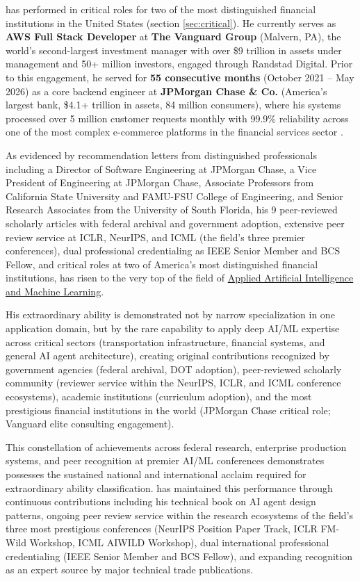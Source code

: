 \dr has performed in critical roles for two of the most distinguished financial institutions in the United States (section \ref{sec:critical}). He currently serves as \textbf{AWS Full Stack Developer} at \textbf{The Vanguard Group} (Malvern, PA), the world's second-largest investment manager with over \$9 trillion in assets under management and 50+ million investors, engaged through Randstad Digital. Prior to this engagement, he served for \textbf{55 consecutive months} (October 2021 -- May 2026) as a core backend engineer at \textbf{JPMorgan Chase \& Co.} (America's largest bank, \$4.1+ trillion in assets, 84 million consumers), where his systems processed over 5 million customer requests monthly with 99.9\% reliability across one of the most complex e-commerce platforms in the financial services sector \cite{CR3, CR13}.

As evidenced by recommendation letters from distinguished professionals including a Director of Software Engineering at JPMorgan Chase, a Vice President of Engineering at JPMorgan Chase, Associate Professors from California State University and FAMU-FSU College of Engineering, and Senior Research Associates from the University of South Florida, his 9 peer-reviewed scholarly articles with federal archival and government adoption, extensive peer review service at ICLR, NeurIPS, and ICML (the field's three premier conferences), dual professional credentialing as IEEE Senior Member and BCS Fellow, and critical roles at two of America's most distinguished financial institutions, \dr has risen to the very top of the field of \underline{Applied Artificial Intelligence and Machine Learning}.

His extraordinary ability is demonstrated not by narrow specialization in one application domain, but by the rare capability to apply deep AI/ML expertise across critical sectors (transportation infrastructure, financial systems, and general AI agent architecture), creating original contributions recognized by government agencies (federal archival, DOT adoption), peer-reviewed scholarly community (reviewer service within the NeurIPS, ICLR, and ICML conference ecosystems), academic institutions (curriculum adoption), and the most prestigious financial institutions in the world (JPMorgan Chase critical role; Vanguard elite consulting engagement).

This constellation of achievements across federal research, enterprise production systems, and peer recognition at premier AI/ML conferences demonstrates \dr possesses the sustained national and international acclaim required for extraordinary ability classification. \dr has maintained this performance through continuous contributions including his technical book on AI agent design patterns, ongoing peer review service within the research ecosystems of the field's three most prestigious conferences (NeurIPS Position Paper Track, ICLR FM-Wild Workshop, ICML AIWILD Workshop), dual international professional credentialing (IEEE Senior Member and BCS Fellow), and expanding recognition as an expert source by major technical trade publications.
